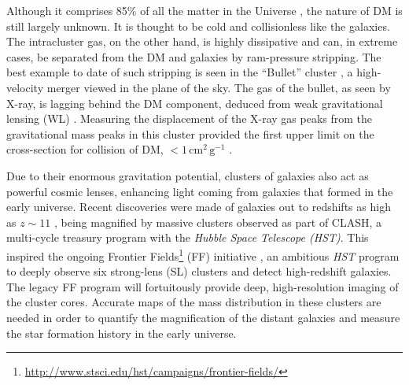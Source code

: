 \documentclass[iop,twocolumn]{emulateapj}
\begin{document}
Although it comprises 85\% of all the matter in the Universe \citep{2013ApJS..208...19H}, the nature of DM is still largely unknown. 
It is thought to be cold and collisionless like the galaxies. 
The intracluster gas, on the other hand, is highly dissipative and can, in extreme cases, be separated from the DM and galaxies by ram-pressure stripping. The best example to date of such stripping is seen in the ``Bullet'' cluster \citep{Markevitch02}, a high-velocity merger viewed in the plane of the sky. The gas of the bullet, as seen by X-ray, is lagging behind the DM component, deduced from weak gravitational lensing (WL) \citep{Clowe04}.
Measuring the displacement of the X-ray gas peaks from the gravitational mass peaks in this cluster provided the first upper limit on the cross-section for collision of DM, $<1\, \mathrm{cm}^2\, \mathrm{g}^{-1}$ \citep{Markevitch2004}.


Due to their enormous gravitation potential, clusters of galaxies also
act as powerful cosmic lenses, enhancing light coming from galaxies that
formed in the early universe. Recent discoveries were made of galaxies
out to redshifts as high as $z\sim11$ \citep{Zheng2012,Coe:2013qy},
being magnified by massive clusters observed as part of CLASH, a
multi-cycle treasury program with the {\em Hubble Space Telescope
(HST)}\citep{Postman+2012_CLASH}. This inspired the ongoing Frontier
Fields\footnote{\url{http://www.stsci.edu/hst/campaigns/frontier-fields/}} 
(FF) initiative \citep{Lotz2014}, an ambitious {\em HST}  program to
deeply observe six strong-lens (SL) clusters and detect high-redshift
galaxies. The legacy FF program will fortuitously provide deep,
high-resolution imaging of the cluster cores. Accurate maps of the mass distribution in these clusters are needed in order to quantify the  magnification of the distant galaxies and measure the star formation history in the early universe.
\end{document}
